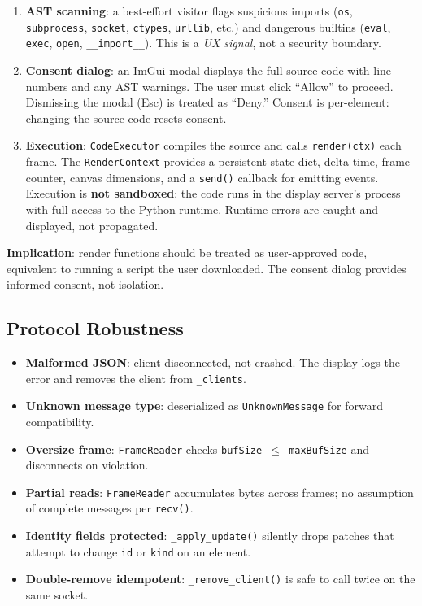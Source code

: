 \documentclass[a4paper,10pt]{article}
\newcommand{\msg}[1]{\texttt{#1}}
\newcommand{\field}[1]{\texttt{#1}}
\begin{document}
\begin{enumerate}
  \item \textbf{AST scanning}: a best-effort visitor flags
    suspicious imports (\texttt{os}, \texttt{subprocess},
    \texttt{socket}, \texttt{ctypes}, \texttt{urllib}, etc.) and
    dangerous builtins (\texttt{eval}, \texttt{exec}, \texttt{open},
    \texttt{\_\_import\_\_}).  This is a \emph{UX signal}, not a
    security boundary.

  \item \textbf{Consent dialog}: an ImGui modal displays the full
    source code with line numbers and any AST warnings.  The user
    must click ``Allow'' to proceed.  Dismissing the modal (Esc) is
    treated as ``Deny.''  Consent is per-element: changing the source
    code resets consent.

  \item \textbf{Execution}: \texttt{CodeExecutor} compiles the
    source and calls \texttt{render(ctx)} each frame.  The
    \texttt{RenderContext} provides a persistent state dict, delta
    time, frame counter, canvas dimensions, and a \texttt{send()}
    callback for emitting events.  Execution is \textbf{not sandboxed}:
    the code runs in the display server's process with full access to
    the Python runtime.  Runtime errors are caught and displayed, not
    propagated.
\end{enumerate}

\textbf{Implication}: render functions should be treated as
user-approved code, equivalent to running a script the user
downloaded.  The consent dialog provides informed consent, not
isolation.

\subsection{Protocol Robustness}

\begin{itemize}
  \item \textbf{Malformed JSON}: client disconnected, not crashed.
    The display logs the error and removes the client from
    \texttt{\_clients}.
  \item \textbf{Unknown message type}: deserialized as
    \msg{UnknownMessage} for forward compatibility.
  \item \textbf{Oversize frame}: \texttt{FrameReader} checks
    \texttt{bufSize $\leq$ maxBufSize} and disconnects on violation.
  \item \textbf{Partial reads}: \texttt{FrameReader} accumulates
    bytes across frames; no assumption of complete messages per
    \texttt{recv()}.
  \item \textbf{Identity fields protected}: \texttt{\_apply\_update()}
    silently drops patches that attempt to change \field{id} or
    \field{kind} on an element.
  \item \textbf{Double-remove idempotent}:
    \texttt{\_remove\_client()} is safe to call twice on the same
    socket.
\end{itemize}
\end{document}

